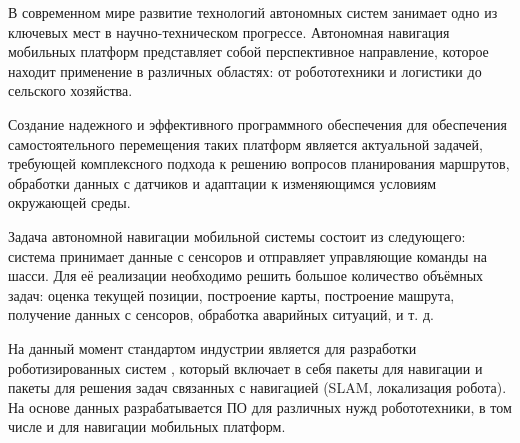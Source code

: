 \label{sec:intro}

В современном мире развитие технологий автономных систем занимает одно из
ключевых мест в научно-техническом прогрессе. Автономная навигация мобильных
платформ представляет собой перспективное направление, которое находит
применение в различных областях: от робототехники и логистики до сельского
хозяйства.

Создание надежного и эффективного программного обеспечения для обеспечения
самостоятельного перемещения таких платформ является актуальной задачей,
требующей комплексного подхода к решению вопросов планирования маршрутов,
обработки данных с датчиков и адаптации к изменяющимся условиям окружающей
среды.

Задача автономной навигации мобильной системы состоит из следующего: система
принимает данные с сенсоров и отправляет управляющие команды на шасси. Для её
реализации необходимо решить большое количество объёмных задач: оценка текущей
позиции, построение карты, построение машрута, получение данных с сенсоров,
обработка аварийных ситуаций, и т. д.

На данный момент стандартом индустрии является  для разработки
роботизированных систем \ros, который включает в себя пакеты для навигации и
пакеты для решения задач связанных с навигацией (SLAM, локализация робота).
На основе данных  разрабатывается ПО для различных нужд
робототехники, в том числе и для навигации мобильных платформ. 



